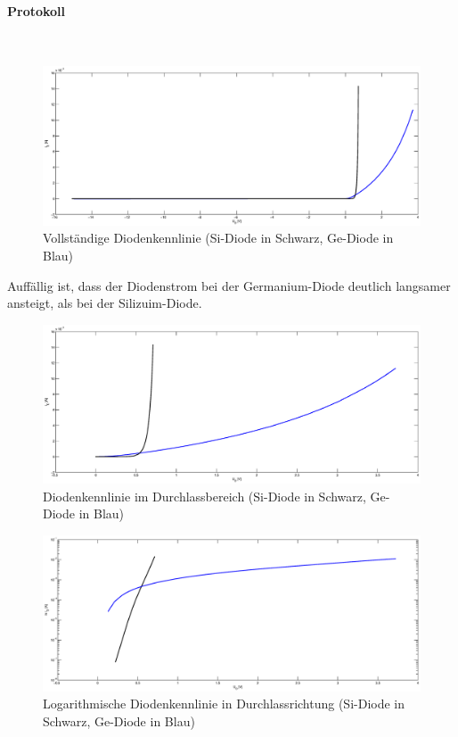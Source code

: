 \documentclass[10pt]{scrreprt}
\begin{document}
    \paragraph{Protokoll}
    $ $
    \begin{figure}[H]
        \includegraphics[width=\textwidth]{GeSiGes}
        \caption{Vollständige Diodenkennlinie (Si-Diode in Schwarz, Ge-Diode in Blau)}
    \end{figure}

    Auffällig ist, dass der Diodenstrom bei der Germanium-Diode deutlich langsamer
    ansteigt, als bei der Silizuim-Diode.

    \begin{figure}[H]
        \includegraphics[width=\textwidth]{GeSiDurch}
        \caption{Diodenkennlinie im Durchlassbereich (Si-Diode in Schwarz, Ge-Diode in Blau)}
        \end{figure}
        \begin{figure}[H]
        \includegraphics[width=\textwidth]{GeSiDurchLog}
        \caption{Logarithmische Diodenkennlinie in Durchlassrichtung (Si-Diode in Schwarz, Ge-Diode in Blau)}
        \label{fig:logzeug}
    \end{figure}
\end{document}
